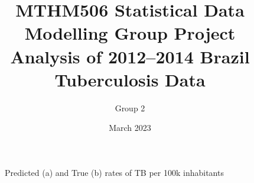 \documentclass{article}
\title{%
  MTHM506 Statistical Data Modelling Group Project\\
  \large Analysis of 2012--2014 Brazil Tuberculosis Data}
\author{
   Group 2
}
\date{March 2023}
\begin{document}
\maketitle











\begin{figure}[H]
	\centering
	\qquad
	\caption{Predicted (a) and True (b) rates of TB per 100k inhabitants}%
	\label{fig:pred_TB_rate_map}%
\end{figure}




\end{document}
